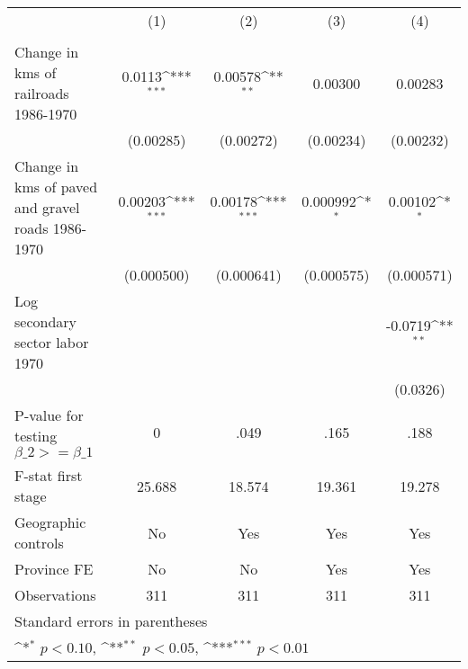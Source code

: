 {
\def\sym#1{\ifmmode^{#1}\else\(^{#1}\)\fi}
\begin{tabular}{l*{4}{c}}
\hline\hline
                &\multicolumn{1}{c}{(1)}&\multicolumn{1}{c}{(2)}&\multicolumn{1}{c}{(3)}&\multicolumn{1}{c}{(4)}\\
                &\multicolumn{1}{c}{}&\multicolumn{1}{c}{}&\multicolumn{1}{c}{}&\multicolumn{1}{c}{}\\
\hline
Change in kms of railroads 1986-1970&   0.0113\sym{***}&  0.00578\sym{**} &  0.00300         &  0.00283         \\
                &(0.00285)         &(0.00272)         &(0.00234)         &(0.00232)         \\
[1em]
Change in kms of paved and gravel roads 1986-1970&  0.00203\sym{***}&  0.00178\sym{***}& 0.000992\sym{*}  &  0.00102\sym{*}  \\
                &(0.000500)         &(0.000641)         &(0.000575)         &(0.000571)         \\
[1em]
Log secondary sector labor 1970&                  &                  &                  &  -0.0719\sym{**} \\
                &                  &                  &                  & (0.0326)         \\
\hline
P-value for testing $\beta\_{2} >= \beta\_{1}$&        0         &     .049         &     .165         &     .188         \\
F-stat first stage&   25.688         &   18.574         &   19.361         &   19.278         \\
Geographic controls&       No         &      Yes         &      Yes         &      Yes         \\
Province FE     &       No         &       No         &      Yes         &      Yes         \\
Observations    &      311         &      311         &      311         &      311         \\
\hline\hline
\multicolumn{5}{l}{\footnotesize Standard errors in parentheses}\\
\multicolumn{5}{l}{\footnotesize \sym{*} \(p<0.10\), \sym{**} \(p<0.05\), \sym{***} \(p<0.01\)}\\
\end{tabular}
}

